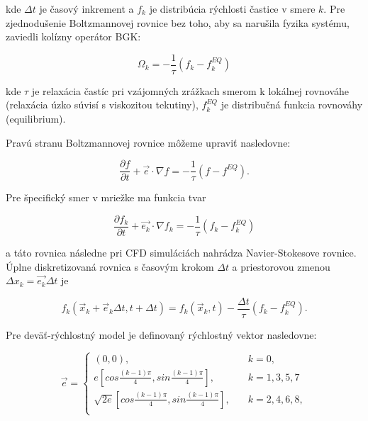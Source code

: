 \documentclass[]{tukediphc}
\begin{document}
kde $\Delta t$ je časový inkrement a $f_k$ je distribúcia rýchlosti častice v smere $k$. Pre zjednodušenie Boltzmannovej rovnice bez toho, aby sa narušila fyzika systému, zaviedli \cite{bhatnagar1954} kolízny operátor BGK:

\begin{equation}
\Omega_k = - \frac{1}{\tau}(f_k-f_k^{EQ})
\end{equation}

kde $\tau$ je relaxácia častíc pri vzájomných zrážkach smerom k lokálnej rovnováhe (relaxácia úzko súvisí s viskozitou tekutiny), $f_k^{EQ}$ je distribučná funkcia rovnováhy (equilibrium).

Pravú stranu Boltzmannovej rovnice môžeme upraviť nasledovne:

\begin{equation}
\frac{\partial f}{\partial t} + \vec{e} \cdot \nabla f = - \frac{1}{\tau}\left(f-f^{EQ}\right).
\end{equation}

Pre špecifický smer v mriežke ma funkcia tvar

\begin{equation}
\frac{\partial f_k}{\partial t} + \vec{e_k} \cdot \nabla f_k = - \frac{1}{\tau} \left(f_k-f_k^{EQ} \right)
\end{equation}

a táto rovnica následne pri CFD simuláciách nahrádza Navier-Stokesove rovnice. Úplne diskretizovaná rovnica s časovým krokom $\Delta t$ a priestorovou zmenou \\ $\Delta x_k=\vec{e_k}\Delta t$ je

\begin{equation}
f_k(\vec{x}_k + \vec{e}_k \Delta t,  t + \Delta t) = f_k(\vec{x}_k,t) - \frac{\Delta t}{\tau} \left(f_k-f_k^{EQ} \right).
\end{equation}

Pre deväť-rýchlostný model je definovaný rýchlostný vektor nasledovne:

\begin{equation}
\vec{e} = \left\{
\begin{array}{ll}
(0,0), & \quad k = 0, \\
e\left[cos \frac{(k-1)\pi}{4}, sin \frac{(k-1)\pi}{4}\right], & \quad k = 1,3,5,7 \\
\sqrt{2e}\left[cos \frac{(k-1)\pi}{4}, sin \frac{(k-1)\pi}{4}\right], & \quad k = 2,4,6,8, \\
\end{array}
\right.
\end{equation}
\end{document}
